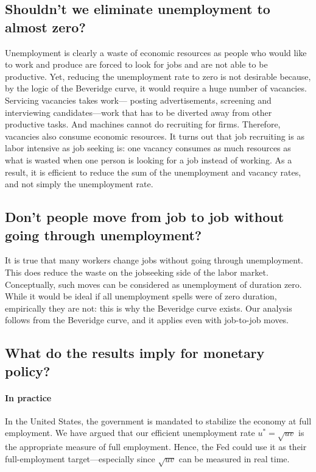 \documentclass[letterpaper,12pt,leqno]{article}
\begin{document}
\subsection{Shouldn't we eliminate unemployment to almost zero?}

Unemployment is clearly a waste of economic resources as people who would like to work and produce are forced to look for jobs and are not able to be productive. Yet, reducing the unemployment rate to zero is not desirable because, by the logic of the Beveridge curve, it would require a huge number of vacancies. Servicing vacancies takes work--- posting advertisements, screening and interviewing candidates---work that has to be diverted away from other productive tasks. And machines cannot do recruiting for firms. Therefore, vacancies also consume economic resources. It turns out that job recruiting is as labor intensive as job seeking is: one vacancy consumes as much resources as what is wasted when one person is looking for a job instead of working. As a result, it is efficient to reduce the sum of the unemployment and vacancy rates, and not simply the unemployment rate.

\subsection{Don't people move from job to job without going through unemployment?}

It is true that many workers change jobs without going through unemployment. This does reduce the waste on the jobseeking side of the labor market. Conceptually, such moves can be considered as unemployment of duration zero. While it would be ideal if all unemployment spells were of zero duration, empirically they are not: this is why the Beveridge curve exists. Our analysis follows from the Beveridge curve, and it applies even with job-to-job moves.

\subsection{What do the results imply for monetary policy?}

\paragraph{In practice} In the United States, the government is mandated to stabilize the economy at full employment. We have argued that our efficient unemployment rate $u^* = \sqrt{uv}$ is the appropriate measure of full employment. Hence, the Fed could use it as their full-employment target---especially since $\sqrt{uv}$ can be measured in real time.
\end{document}
